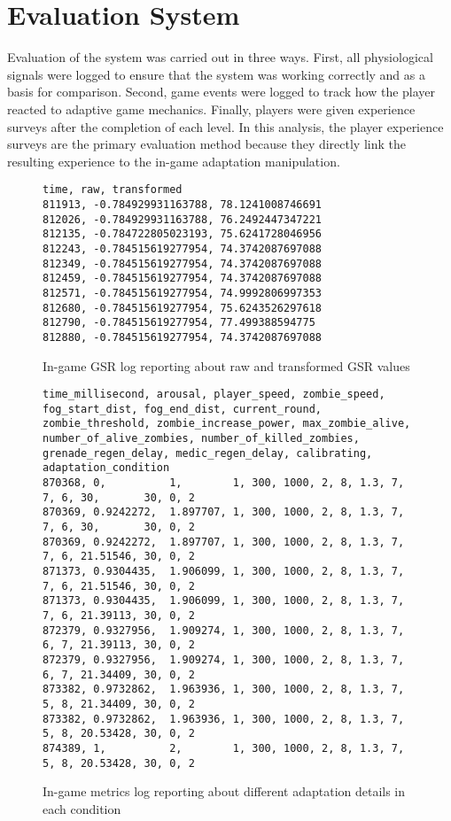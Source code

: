 \section{Evaluation System}
Evaluation of the system was carried out in three ways. First, all physiological signals were logged to ensure that the system was working correctly and as a basis for comparison. Second, game events were logged to track how the player reacted to adaptive game mechanics. Finally, players were given experience surveys after the completion of each level. In this analysis, the player experience surveys are the primary evaluation method because they directly link the resulting experience to the in-game adaptation manipulation.

\begin{figure}
  \centering
\begin{lstlisting}[language=csv]
time, raw, transformed
811913, -0.784929931163788, 78.1241008746691
812026, -0.784929931163788, 76.2492447347221
812135, -0.784722805023193, 75.6241728046956
812243, -0.784515619277954, 74.3742087697088
812349, -0.784515619277954, 74.3742087697088
812459, -0.784515619277954, 74.3742087697088
812571, -0.784515619277954, 74.9992806997353
812680, -0.784515619277954, 75.6243526297618
812790, -0.784515619277954, 77.499388594775
812880, -0.784515619277954, 74.3742087697088
\end{lstlisting}
  \caption{In-game GSR log reporting about raw and transformed GSR values}
  \label{txt:log-gsr}
\end{figure}

\begin{figure}
  \centering
\begin{lstlisting}[language=csv]
time_millisecond, arousal, player_speed, zombie_speed, fog_start_dist, fog_end_dist, current_round, zombie_threshold, zombie_increase_power, max_zombie_alive, number_of_alive_zombies, number_of_killed_zombies, grenade_regen_delay, medic_regen_delay, calibrating, adaptation_condition
870368, 0,          1,        1, 300, 1000, 2, 8, 1.3, 7, 7, 6, 30,       30, 0, 2
870369, 0.9242272,  1.897707, 1, 300, 1000, 2, 8, 1.3, 7, 7, 6, 30,       30, 0, 2
870369, 0.9242272,  1.897707, 1, 300, 1000, 2, 8, 1.3, 7, 7, 6, 21.51546, 30, 0, 2
871373, 0.9304435,  1.906099, 1, 300, 1000, 2, 8, 1.3, 7, 7, 6, 21.51546, 30, 0, 2
871373, 0.9304435,  1.906099, 1, 300, 1000, 2, 8, 1.3, 7, 7, 6, 21.39113, 30, 0, 2
872379, 0.9327956,  1.909274, 1, 300, 1000, 2, 8, 1.3, 7, 6, 7, 21.39113, 30, 0, 2
872379, 0.9327956,  1.909274, 1, 300, 1000, 2, 8, 1.3, 7, 6, 7, 21.34409, 30, 0, 2
873382, 0.9732862,  1.963936, 1, 300, 1000, 2, 8, 1.3, 7, 5, 8, 21.34409, 30, 0, 2
873382, 0.9732862,  1.963936, 1, 300, 1000, 2, 8, 1.3, 7, 5, 8, 20.53428, 30, 0, 2
874389, 1,          2,        1, 300, 1000, 2, 8, 1.3, 7, 5, 8, 20.53428, 30, 0, 2
\end{lstlisting}
  \caption{In-game metrics log reporting about different adaptation details in each condition}
  \label{txt:log-metrics}
\end{figure}
